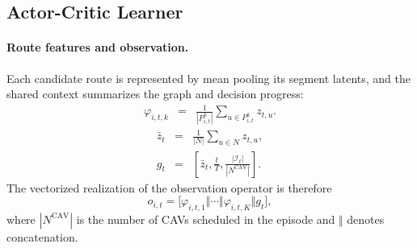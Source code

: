 \subsection{Actor-Critic Learner}

\paragraph{Route features and observation.}  Each candidate route is
represented by mean pooling its segment latents, and the shared context
summarizes the graph and decision progress:
\begin{equation}
\begin{array}{rcl}
\varphi_{i,t,k}
&=&
\displaystyle
\frac{1}{|P^k_{i,t}|}
\sum_{u\in P^k_{i,t}}z_{t,u}.
\end{array}
\end{equation}
\begin{equation}
\begin{array}{rcl}
\bar z_t
&=&
\displaystyle
\frac{1}{|N|}\sum_{u\in N}z_{t,u},\\[0.35em]
g_t
&=&
\displaystyle
\left[
\bar z_t,
\frac{t}{T},
\frac{|\mathcal{I}_t|}{|N^{\mathrm{CAV}}|}
\right].
\end{array}
\end{equation}
The vectorized realization of the observation operator is therefore
\begin{equation}
o_{i,t}
=
\big[
\varphi_{i,t,1}\Vert\cdots\Vert
\varphi_{i,t,K}\Vert g_t
\big],
\end{equation}
where \(|N^{\mathrm{CAV}}|\) is the number of CAVs scheduled in the episode
and \(\Vert\) denotes concatenation.

